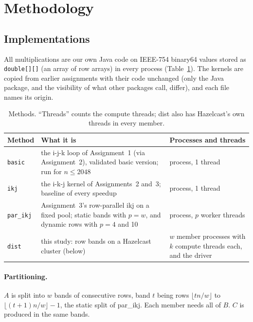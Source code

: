 \documentclass[11pt,a4paper]{article}
\begin{document}
\section{Methodology}
\label{sec:method}

\subsection{Implementations}
\label{sec:impl}

All multiplications are our own Java code on IEEE-754 binary64 values stored as
\texttt{double[][]} (an array of row arrays) in every process
(Table~\ref{tab:methods}). The kernels are copied from earlier assignments
with their code unchanged (only the Java package, and the visibility of what
other packages call, differ), and each file names its origin.

\begin{table}[htbp]
\centering\small
\caption{Methods. ``Threads'' counts the compute threads; dist also has
Hazelcast's own threads in every member.}
\label{tab:methods}
\begin{tabular}{>{\raggedright}p{2.0cm}>{\raggedright}p{6.9cm}>{\raggedright\arraybackslash}p{5.3cm}}
\toprule
Method & What it is & Processes and threads \\
\midrule
\texttt{basic} & the i-j-k loop of Assignment~1 (via Assignment~2), validated basic version; run for $n\le2048$ & 1 process, 1 thread \\
\texttt{ikj} & the i-k-j kernel of Assignments~2 and~3; baseline of every speedup & 1 process, 1 thread \\
\texttt{par\_ikj} & Assignment~3's row-parallel ikj on a fixed pool; static bands with $p=w$, and dynamic rows with $p=4$ and 10 & 1 process, $p$ worker threads \\
\texttt{dist} & this study: row bands on a Hazelcast cluster (below) & $w$ member processes with $k$ compute threads each, and the driver \\
\bottomrule
\end{tabular}
\end{table}

\paragraph{Partitioning.} $A$ is split into $w$ bands of consecutive rows,
band $t$ being rows $\lfloor tn/w\rfloor$ to $\lfloor(t+1)n/w\rfloor-1$, the
static split of par\_ikj. Each member needs all of $B$. $C$ is produced in
the same bands.
\end{document}
